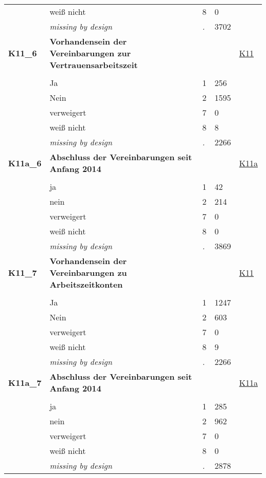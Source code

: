 \begin{longtable}{| L{2.65cm} | L{8cm} | C{1.5cm} | R{1.25cm} | C{2.25cm}  |}
   & weiß nicht & 8 & 0 &  \\ 
   & \textit{missing by design} & \textit{.} & 3702 &  \\ 
   \midrule
\textbf{K11\_6}\label{var:K11:6} & \textbf{Vorhandensein der Vereinbarungen zur Vertrauensarbeitszeit} &  &  & \hyperref[K11]{K11} \\ 
   &  &  &  &  \\ 
   & Ja & 1 & 256 &  \\ 
   & Nein & 2 & 1595 &  \\ 
   & verweigert & 7 & 0 &  \\ 
   & weiß nicht & 8 & 8 &  \\ 
   & \textit{missing by design} & \textit{.} & 2266 &  \\ 
   \midrule
\textbf{K11a\_6}\label{var:K11a:6} & \textbf{Abschluss der Vereinbarungen seit Anfang 2014} &  &  & \hyperref[K11a]{K11a} \\ 
   &  &  &  &  \\ 
   & ja & 1 & 42 &  \\ 
   & nein & 2 & 214 &  \\ 
   & verweigert & 7 & 0 &  \\ 
   & weiß nicht & 8 & 0 &  \\ 
   & \textit{missing by design} & \textit{.} & 3869 &  \\ 
   \midrule
\textbf{K11\_7}\label{var:K11:7} & \textbf{Vorhandensein der Vereinbarungen zu Arbeitszeitkonten} &  &  & \hyperref[K11]{K11} \\ 
   &  &  &  &  \\ 
   & Ja & 1 & 1247 &  \\ 
   & Nein & 2 & 603 &  \\ 
   & verweigert & 7 & 0 &  \\ 
   & weiß nicht & 8 & 9 &  \\ 
   & \textit{missing by design} & \textit{.} & 2266 &  \\ 
   \midrule
\textbf{K11a\_7}\label{var:K11a:7} & \textbf{Abschluss der Vereinbarungen seit Anfang 2014} &  &  & \hyperref[K11a]{K11a} \\ 
   &  &  &  &  \\ 
   & ja & 1 & 285 &  \\ 
   & nein & 2 & 962 &  \\ 
   & verweigert & 7 & 0 &  \\ 
   & weiß nicht & 8 & 0 &  \\ 
   & \textit{missing by design} & \textit{.} & 2878 &  \\ 

\end{longtable}
